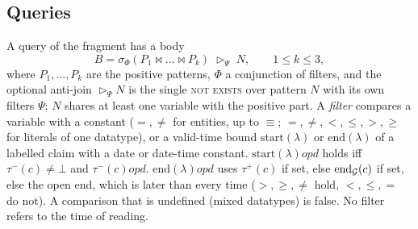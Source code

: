 \subsection{Queries}

A query of the fragment has a body
\[
B=\sigma_\Phi(P_1\bowtie\dots\bowtie P_k)\;\rhd_\Psi\;N,\qquad 1\le k\le 3,
\]
where $P_1,\dots,P_k$ are the positive patterns, $\Phi$ a conjunction of filters, and the optional
anti-join $\rhd_\Psi N$ is the single \textsc{not exists} over pattern $N$ with its own filters
$\Psi$; $N$ shares at least one variable with the positive part. A \emph{filter} compares a
variable with a constant ($=,\neq$ for entities, up to $\equiv$; $=,\neq,<,\le,>,\ge$ for literals
of one datatype), or a valid-time bound $\mathrm{start}(\lambda)$ or $\mathrm{end}(\lambda)$ of a
labelled claim with a date or date-time constant. $\mathrm{start}(\lambda)\mathrel{op}d$ holds iff
$\tau^-(c)\neq\bot$ and $\tau^-(c)\mathrel{op}d$. $\mathrm{end}(\lambda)\mathrel{op}d$ uses
$\tau^+(c)$ if set, else $\mathrm{end}_\mathcal G(c)$ if set, else the open end, which is later than every
time ($>,\ge,\neq$ hold, $<,\le,=$ do not). A comparison that is undefined (mixed datatypes) is
false. No filter refers to the time of reading.

